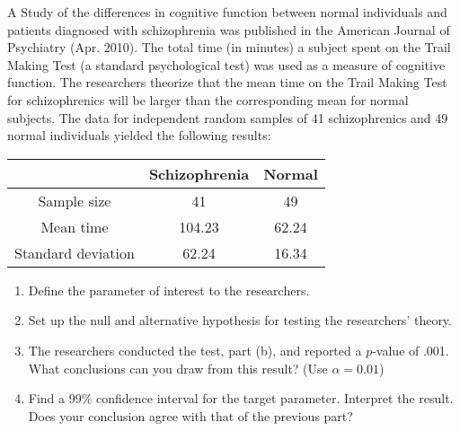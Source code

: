 
\begin{exercise}

A Study of the differences in cognitive function between normal
individuals and patients diagnosed with schizophrenia was published
in the American Journal of Psychiatry (Apr. 2010). The total time
(in minutes) a subject spent on the Trail Making Test (a standard
psychological test) was used as a measure of cognitive function.
The researchers theorize that the mean time on the Trail Making Test
for schizophrenics will be larger than the corresponding mean for normal
subjects. The data for independent random samples of 41 schizophrenics
and 49 normal individuals yielded the following results:

\begin{center}
\begin{tabular}{c|cc}
    & Schizophrenia & Normal \\
    \hline
    Sample size & 41 & 49 \\
    Mean time & 104.23 & 62.24 \\
    Standard deviation & 62.24 & 16.34
\end{tabular}
\end{center}

\begin{enumerate}[label = (\alph*)]
    \item Define the parameter of interest to the researchers.
    \item Set up the null and alternative hypothesis for testing
    the researchers' theory.
    \item The researchers conducted the test, part (b), and reported a
    $p$-value of .001. What conclusions can you draw from this result?
    (Use $\alpha = 0.01$)
    \item Find a 99\% confidence interval for the target parameter.
    Interpret the result. Does your conclusion agree with that
    of the previous part?
\end{enumerate}

\end{exercise}


